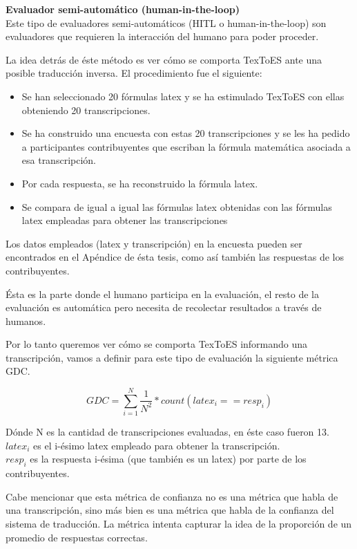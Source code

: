 {\Large \textbf{Evaluador semi-automático (human-in-the-loop)}}\\

Este tipo de evaluadores semi-automáticos (HITL o human-in-the-loop\cite{9}) son evaluadores que requieren la interacción del humano para poder proceder.

La idea detrás de éste método es ver cómo se comporta TexToES ante una posible traducción inversa. El procedimiento fue el siguiente:

\begin{itemize}
   \item Se han seleccionado 20 fórmulas latex y se ha estimulado TexToES con ellas obteniendo 20 transcripciones.
   \item Se ha construido una encuesta con estas 20 transcripciones y se les ha pedido a participantes contribuyentes que escriban la fórmula matemática asociada a esa transcripción.
   \item Por cada respuesta, se ha reconstruido la fórmula latex.
   \item Se compara de igual a igual las fórmulas latex obtenidas con las fórmulas latex empleadas para obtener las transcripciones
\end{itemize}

Los datos empleados (latex y transcripción) en la encuesta pueden ser encontrados en el Apéndice de ésta tesis, como así también las respuestas de los contribuyentes.

Ésta es la parte donde el humano participa en la evaluación, el resto de la evaluación es automática pero necesita de recolectar resultados a través de humanos.

Por lo tanto queremos ver cómo se comporta TexToES informando una transcripción, vamos a definir para este tipo de evaluación la siguiente métrica GDC.

$$GDC = \sum_{i=1}^{N} \frac{1}{N^2}*count(latex_i==resp_i)$$

Dónde N es la cantidad de transcripciones evaluadas, en éste caso fueron 13.\\
$latex_i$ es el i-ésimo latex empleado para obtener la transcripción.\\
$resp_i$ es la respuesta i-ésima (que también es un latex) por parte de los contribuyentes.

Cabe mencionar que esta métrica de confianza no es una métrica que habla de una transcripción, sino más bien es una métrica que habla de la confianza del sistema de traducción. La métrica intenta capturar la idea de la proporción de un promedio de respuestas correctas.\\

